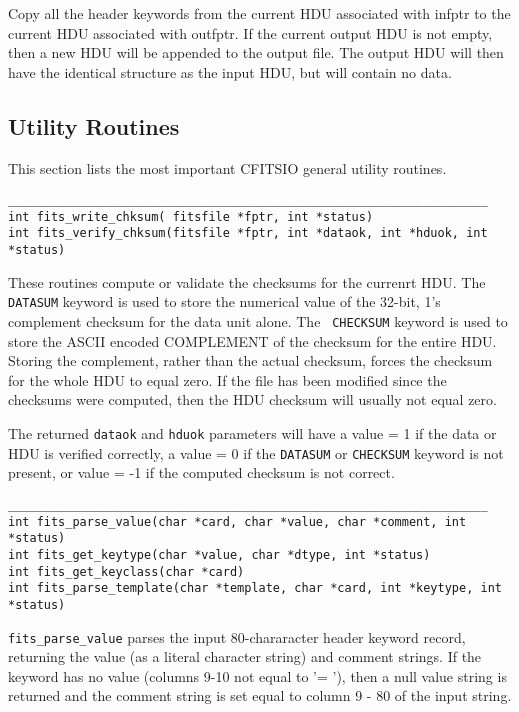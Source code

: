 \documentclass[11pt]{article}
\begin{document}
Copy all the header keywords from the current HDU associated with
infptr to the current HDU associated with outfptr.  If the current
output HDU is not empty, then a new HDU will be appended to the output
file. The output HDU will then have the identical structure as the
input HDU, but will contain no data.

\newpage
\subsection{Utility Routines}

This section lists the most important CFITSIO general utility routines.

\begin{verbatim}
___________________________________________________________________
int fits_write_chksum( fitsfile *fptr, int *status)
int fits_verify_chksum(fitsfile *fptr, int *dataok, int *hduok, int *status)
\end{verbatim}

These routines  compute or validate the checksums for the currenrt
HDU.  The {\tt DATASUM} keyword is used to store the numerical value of
the 32-bit, 1's complement checksum for the data unit alone.  The {\tt
CHECKSUM} keyword is used to store the ASCII encoded COMPLEMENT of the
checksum for the entire HDU.  Storing the complement, rather than the
actual checksum, forces the checksum for the whole HDU to equal zero.
If the file has been modified since the checksums were computed, then
the HDU checksum will usually not equal zero.

The returned {\tt dataok} and {\tt hduok} parameters will have a value
= 1 if the data or HDU is verified correctly, a value = 0 if the
{\tt DATASUM} or {\tt CHECKSUM} keyword is not present, or value = -1 if the
computed checksum is not correct.


\begin{verbatim}
___________________________________________________________________
int fits_parse_value(char *card, char *value, char *comment, int *status)
int fits_get_keytype(char *value, char *dtype, int *status)
int fits_get_keyclass(char *card)
int fits_parse_template(char *template, char *card, int *keytype, int *status)

\end{verbatim}

{\tt fits\_parse\_value} parses the input 80-chararacter header keyword record, returning
the value (as a literal character string) and comment strings.  If the
keyword has no value (columns 9-10 not equal to '= '), then a null
value string is returned and the comment string is set equal to column
9 - 80 of the input string.
\end{document}
